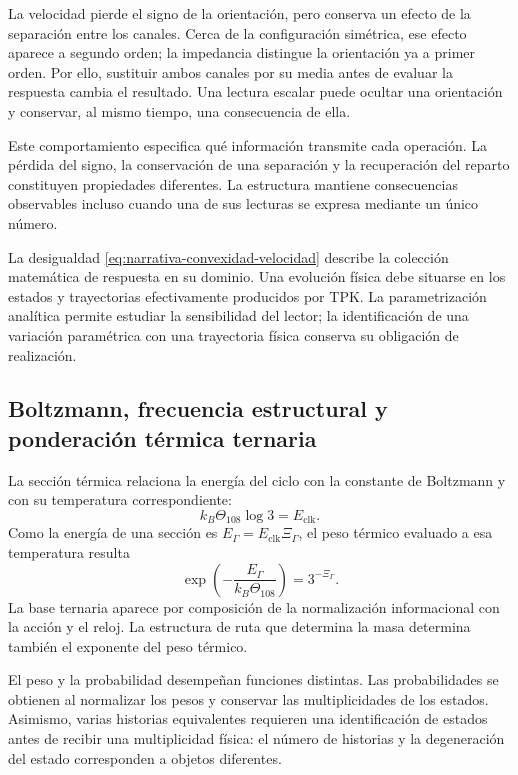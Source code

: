 La velocidad pierde el signo de la orientación, pero conserva un efecto
de la separación entre los canales. Cerca de la configuración simétrica,
ese efecto aparece a segundo orden; la impedancia distingue la orientación
ya a primer orden. Por ello, sustituir ambos canales por su media antes de
evaluar la respuesta cambia el resultado. Una lectura escalar puede ocultar
una orientación y conservar, al mismo tiempo, una consecuencia de ella.

Este comportamiento especifica qué información transmite cada operación.
La pérdida del signo, la conservación de una separación y la recuperación
del reparto constituyen propiedades diferentes. La estructura mantiene
consecuencias observables incluso cuando una de sus lecturas se expresa
mediante un único número.

La desigualdad \eqref{eq:narrativa-convexidad-velocidad} describe la colección
matemática de respuesta en su dominio. Una evolución física debe situarse
en los estados y trayectorias efectivamente producidos por TPK. La
parametrización analítica permite estudiar la sensibilidad del lector;
la identificación de una variación paramétrica con una trayectoria física
conserva su obligación de realización.

\subsection{Boltzmann, frecuencia estructural y ponderación térmica ternaria}
\label{subsec:narrativa-boltzmann}

La sección térmica relaciona la energía del ciclo con la constante de
Boltzmann y con su temperatura correspondiente:
\begin{equation}
 k_B\Theta_{108}\log3=E_{\mathrm{clk}}.
 \label{eq:narrativa-boltzmann-ciclo}
\end{equation}
Como la energía de una sección es
$E_\Gamma=E_{\mathrm{clk}}\Xi_\Gamma$, el peso térmico evaluado a esa
temperatura resulta
\begin{equation}
 \boxed{\exp\!\left(-\frac{E_\Gamma}{k_B\Theta_{108}}\right)
       =3^{-\Xi_\Gamma}.}
 \label{eq:narrativa-peso-termico}
\end{equation}
La base ternaria aparece por composición de la normalización informacional
con la acción y el reloj. La estructura de ruta que determina la masa
determina también el exponente del peso térmico.

El peso y la probabilidad desempeñan funciones distintas. Las probabilidades
se obtienen al normalizar los pesos y conservar las multiplicidades de los
estados. Asimismo, varias historias equivalentes requieren una identificación
de estados antes de recibir una multiplicidad física: el número de historias
y la degeneración del estado corresponden a objetos diferentes.

